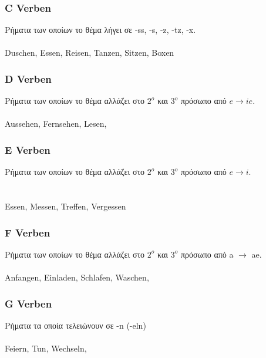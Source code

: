 \begin{appendix}
 \subsubsection{C Verben}
 Ρήματα των οποίων το θέμα λήγει σε -ss, -s, -z, -tz, -x. \\
  \\ \newline
 \gls{Duschen}, \gls{Essen}, \gls{Reisen}, \gls{Tanzen}, \gls{Sitzen}, \gls{Boxen}
 \subsubsection{D Verben}
 Ρήματα των οποίων το θέμα αλλάζει στο $2^o$ και $3^ο$ πρόσωπο από $e \rightarrow ie$. \\
  \\
 
 \gls{Aussehen}, \gls{Fernsehen}, \gls{Lesen}, 
 
 \subsubsection{E Verben}
 Ρήματα των οποίων το θέμα αλλάζει στο $2^o$ και $3^ο$ πρόσωπο από $e \rightarrow i$. \\
  \\
  \\
 
 \gls{Essen}, \gls{Messen}, \gls{Treffen}, \gls{Vergessen}
 
 \subsubsection{F Verben}
 Ρήματα των οποίων το θέμα αλλάζει στο $2^o$ και $3^ο$ πρόσωπο από a $\rightarrow$ ae. \\
  \\
 
 \gls{Anfangen}, \gls{Einladen}, \gls{Schlafen}, \gls{Waschen}, 
 
 \subsubsection{G Verben}
 Ρήματα τα οποία τελειώνουν σε -n (-eln) \\
  \\
 \gls{Feiern}, \gls{Tun}, \gls{Wechseln}, 
 

\end{appendix}
